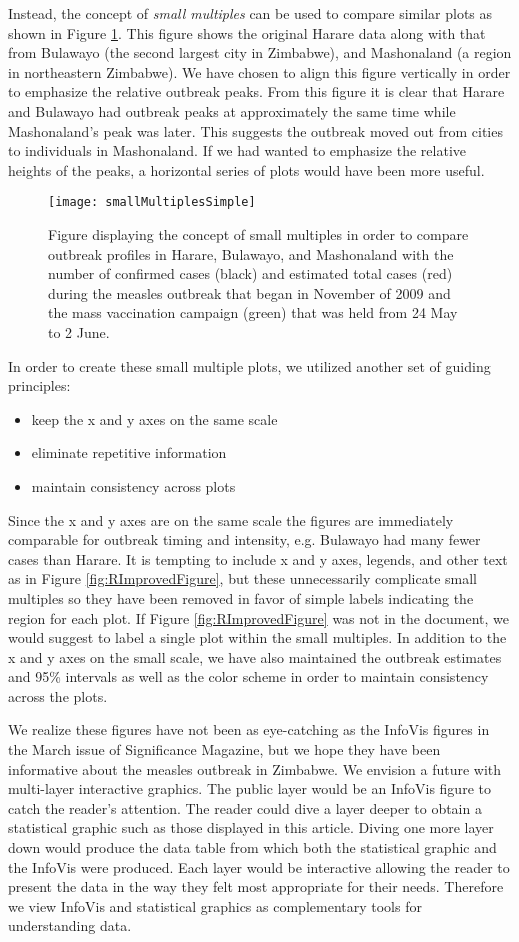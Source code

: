 \documentclass{article}
\begin{document}
Instead, the concept of \emph{small multiples} can be used to compare similar plots as shown in Figure \ref{fig:smallMultiples}. This figure shows the original Harare data along with that from Bulawayo (the second largest city in Zimbabwe), and Mashonaland (a region in northeastern Zimbabwe). We have chosen to align this figure vertically in order to emphasize the relative outbreak peaks. From this figure it is clear that Harare and Bulawayo had outbreak peaks at approximately the same time while Mashonaland's peak was later. This suggests the outbreak moved out from cities to individuals in Mashonaland. If we had wanted to emphasize the relative heights of the peaks, a horizontal series of plots would have been more useful.
\begin{figure}[ht]
\centering
\texttt{[image: smallMultiplesSimple]}
\caption{Figure displaying the concept of small multiples in order to compare outbreak profiles in Harare, Bulawayo, and Mashonaland with the number of confirmed cases (black) and estimated total cases (red)  during the measles outbreak that began in November of 2009 and the mass vaccination campaign (green) that was held from 24 May to 2 June.}
\label{fig:smallMultiples}
\end{figure}

In order to create these small multiple plots, we utilized another set of guiding principles:
\begin{itemize}
\item keep the x and y axes on the same scale
\item eliminate repetitive information
\item maintain consistency across plots
\end{itemize}
Since the x and y axes are on the same scale the figures are immediately comparable for outbreak timing and intensity, e.g. Bulawayo had many fewer cases than Harare. It is tempting to include x and y axes, legends, and other text as in Figure \ref{fig:RImprovedFigure}, but these unnecessarily complicate small multiples so they have been removed in favor of simple labels indicating the region for each plot. If Figure \ref{fig:RImprovedFigure} was not in the document, we would suggest to label a single plot within the small multiples. In addition to the x and y axes on the small scale, we have also maintained the outbreak estimates and 95\% intervals as well as the color scheme in order to maintain consistency across the plots.

We realize these figures have not been as eye-catching as the InfoVis figures in the March issue of Significance Magazine, but we hope they have been informative about the measles outbreak in Zimbabwe.  We envision a future with multi-layer interactive graphics. The public layer would be an InfoVis figure to catch the reader's attention. The reader could dive a layer deeper to obtain a statistical graphic such as those displayed in this article. Diving one more layer down would produce the data table from which both the statistical graphic and the InfoVis were produced. Each layer would be interactive allowing the reader to present the data in the way they felt most appropriate for their needs. Therefore we view InfoVis and statistical graphics as complementary tools for understanding data.
\end{document}
